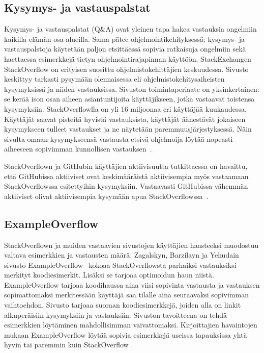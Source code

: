 \documentclass[finnish]{tktltiki2}
\theoremstyle{definition}
\theoremstyle{remark}
\begin{document}
\subsection{Kysymys- ja vastauspalstat}
Kysymys- ja vastauspalstat (Q\&A) ovat yleinen tapa hakea vastauksia ongelmiin kaikilla elämän osa-alueilla. Sama pätee ohjelmointikehityksessä: kysymys- ja vastauspalstoja käytetään paljon etsittäessä sopivia ratkaisuja ongelmiin sekä haettaessa esimerkkejä tietyn ohjelmointirajapinnan käyttöön. StackExchangen StackOverflow on erityisen suosittu ohjelmistokehittäjien keskuudessa. Sivusto keskittyy tarkasti pysymään olennaisessa eli ohjelmistokehitysaiheisten kysymyksissä ja niiden vastauksissa. Sivuston toimintaperiaate on yksinkertainen: se kerää ison osan aiheen asiantuntijoita käyttäjikseen, jotka vastaavat toistensa kysymyksiin. StackOverflowlla on yli 16 miljoonaa eri käyttäjää kuukaudessa. Käyttäjät saavat pisteitä hyvistä vastauksista, käyttäjät äänestävät jokaiseen kysymykseen tulleet vastaukset ja ne näytetään paremmuusjärjestyksessä. Näin sivulta omaan kysymykseensä vastausta etsivä ohjelmoija löytää nopeasti aiheeseen sopivimman kunnollisen vastauksen~\cite{social-networking-meets-se}.

StackOverflown ja GitHubin käyttäjien aktiivisuutta tutkittaessa on havaittu, että GitHubissa aktiiviset ovat keskimääräistä aktiivisempia myös vastaamaan StackOverflowssa esitettyihin kysymyksiin. Vastaavasti GitHubissa vähemmän aktiiviset olivat aktiivisempia kysymään apua StackOverflowssa~\cite{stackoverflow-and-github}.

\subsection{ExampleOverflow}
StackOverflown ja muiden vastaavien sivustojen käyttäjien haasteeksi muodostuu valtava esimerkkien ja vastausten määrä. Zagalskyn, Barzilayn ja Yehudain sivusto ExampleOverflow~\cite{example-overflow-social-media-for-code-recommendations} kokoaa StackOverflowsta parhaiksi vastauksiksi merkityt koodiesimerkit. Lisäksi se tarjoaa optimoidun haun niistä. ExampleOverflow tarjoaa koodihaussa aina viisi sopivinta vastausta ja vastauksen sopimattomaksi merkitessään käyttäjä saa tilalle aina seuraavaksi sopivimman vaihtoehdon. Sivusto tarjoaa suoraan koodiesimerkkejä, joiden alla on linkit alkuperäisiin kysymyksiin ja vastauksiin. Sivuston tavoitteena on tehdä esimerkkien löytäminen mahdollisimman vaivattomaksi. Kirjoittajien havaintojen mukaan ExampleOverflow löytää sopivia esimerkkejä useissa tapauksissa yhtä hyvin tai paremmin kuin StackOverflow \cite{example-overflow-social-media-for-code-recommendations}.
\end{document}
